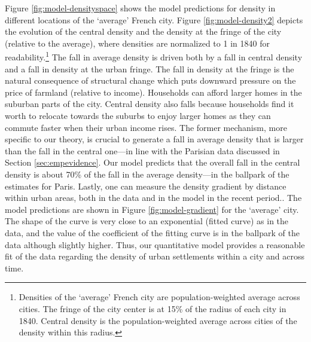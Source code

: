 \documentclass[./20250130-paper.tex]{subfiles}
\begin{document}

 Figure \ref{fig:model-densityspace} shows the model predictions for density in different locations of the `average' French city. Figure \ref{fig:model-density2} depicts the evolution of the central density and the density at the fringe of the city (relative to the average), where densities are normalized to 1 in 1840 for readability.\footnote{Densities of the `average' French city are population-weighted average across cities. The fringe of the city center is at 15\% of the radius of each city in 1840. Central density is the population-weighted average across cities of the density within this radius.} The fall in average density is driven both by a fall in central density and a fall in density at the urban fringe. The fall in density at the fringe is the natural consequence of structural change which puts downward pressure on the price of farmland (relative to income). Households can afford larger homes in the suburban parts of the city. Central density also falls because households find it worth to relocate towards the suburbs to enjoy larger homes as they can commute faster when their urban income rises. The former mechanism, more specific to our theory, is crucial to generate a fall in average density that is larger than the fall in the central one---in line with the Parisian data discussed in Section \ref{sec:empevidence}. Our model predicts that the overall fall in the central density is about 70\% of the fall in the average density---in the ballpark of the estimates for Paris. Lastly, one can measure the density gradient by distance within urban areas, both in the data and in the model in the recent period.. The model predictions are shown in Figure \ref{fig:model-gradient} for the `average' city. The shape of the curve is very close to an exponential (fitted curve) as in the data, and the value of the coefficient of the fitting curve is in the ballpark of the data although slightly higher. Thus, our quantitative model provides a reasonable fit of the data regarding the density of urban settlements within a city and across time.
\end{document}
